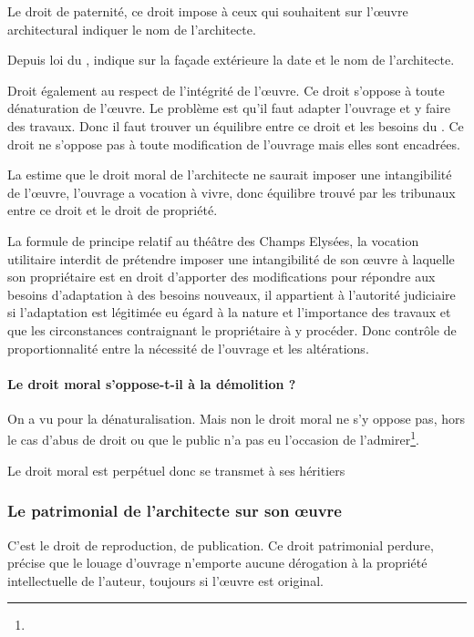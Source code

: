 			Le droit de paternité, ce droit impose à ceux qui souhaitent sur l’œuvre architectural indiquer le nom de l’architecte.


			Depuis loi du , indique sur la façade extérieure la date et le nom de l’architecte.


			Droit également au respect de l’intégrité de l’œuvre. Ce droit s’oppose à toute dénaturation de l’œuvre. Le problème est qu’il faut adapter l’ouvrage et y faire des travaux. Donc il faut trouver un équilibre entre ce droit et les besoins du \Mo. Ce droit ne s’oppose pas à toute modification de l’ouvrage mais elles sont encadrées.


			La \jp estime que le droit moral de l’architecte ne saurait imposer une intangibilité de l’œuvre, l’ouvrage a vocation à vivre, donc équilibre trouvé par les tribunaux entre ce droit et le droit de propriété.


			La formule de principe relatif au théâtre des Champs Elysées, la vocation utilitaire interdit de prétendre imposer une intangibilité de son œuvre à laquelle son propriétaire est en droit d’apporter des modifications pour répondre aux besoins d’adaptation à des besoins nouveaux, il appartient à l’autorité judiciaire si l’adaptation est légitimée eu égard à la nature et l’importance des travaux et que les circonstances contraignant le propriétaire à y procéder. Donc contrôle de proportionnalité entre la nécessité de l’ouvrage et les altérations.


			\paragraph{Le droit moral s’oppose-t-il à la démolition ? }

			On a vu pour la dénaturalisation. Mais non le droit moral ne s’y oppose pas, hors le cas d’abus de droit ou que le public n’a pas eu l’occasion de l’admirer\footnote{}.

			Le droit moral est perpétuel donc se transmet à ses héritiers


		\subsubsection{Le patrimonial de l'architecte sur son œuvre}

			C’est le droit de reproduction, de publication. Ce droit patrimonial perdure,  précise que le louage d’ouvrage n’emporte aucune dérogation à la propriété intellectuelle de l’auteur, toujours si l’œuvre est original.


